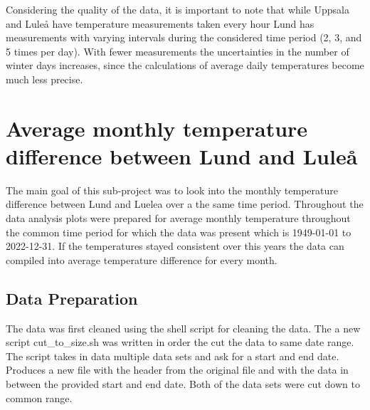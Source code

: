 \documentclass[aps,prl,groupedaddress,twocolumn]{revtex4-1}
\begin{document}
Considering the quality of the data, it is important to note that while Uppsala and Luleå have temperature measurements taken every hour Lund has measurements with varying intervals during the considered time period (2, 3, and 5 times per day). With fewer measurements the uncertainties in the number of winter days increases, since the calculations of average daily temperatures become much less precise.

\section{Average monthly temperature difference between Lund and Luleå}

The main goal of this sub-project was to look into the monthly temperature difference between Lund and Luelea over a the same time period. Throughout the data analysis plots were prepared for average monthly temperature throughout the common time period for which the data was present which is 1949-01-01 to 2022-12-31. If the temperatures stayed consistent over this years the data can compiled into average temperature difference for every month. 
\vspace{-0.5cm}

\subsection{Data Preparation}
The data was first cleaned using the shell script for cleaning the data. The a new script cut\_to\_size.sh was written in order the cut the data to same date range. The script takes in data multiple data sets and ask for a start and end date. Produces a new file with the header from the original file and with the data in between the provided start and end date. Both of the data sets were cut down to common range. 
\vspace{-0.3cm}
\end{document}
